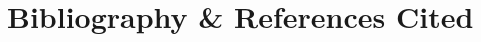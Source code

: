 \documentclass{casicswhitepaper}
\begin{document}
\clearpage
\section*{Bibliography \& References Cited}
\renewcommand{\refname}{}               %
\vspace*{-2ex}


\end{document}
